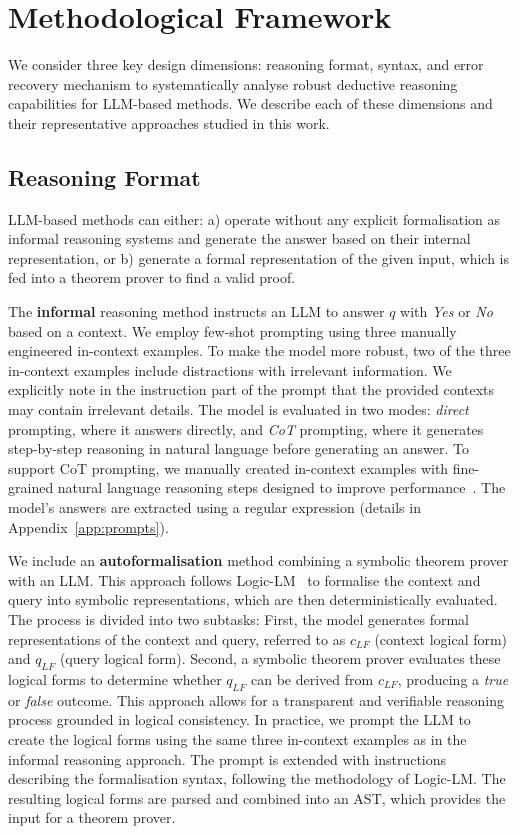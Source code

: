 \section{Methodological Framework}
We consider three key design dimensions: reasoning format, syntax, and error recovery mechanism to systematically analyse robust deductive reasoning capabilities for \ac{LLM}-based methods. We describe each of these dimensions and their representative approaches studied in this work. 

\subsection{Reasoning Format}
\ac{LLM}-based methods can either: a) operate without any explicit formalisation as informal reasoning systems and generate the answer based on their internal representation, or b) generate a formal representation of the given input, which is fed into a theorem prover to find a valid proof.   


The \textbf{informal} reasoning method instructs an \ac{LLM} to answer $q$ with \emph{Yes} or \emph{No} based on a context.
We employ few-shot prompting using three manually engineered in-context examples. To make the model more robust, two of the three in-context examples include distractions with irrelevant information. We explicitly note in the instruction part of the prompt that the provided contexts may contain irrelevant details.
The model is evaluated in two modes: \textit{direct} prompting, where it answers directly, and \textit{\ac{CoT}} prompting, where it generates step-by-step reasoning in natural language before generating an answer. To support \ac{CoT} prompting, we manually created in-context examples with fine-grained natural language reasoning steps designed to improve performance~\cite{wei_chain_2022}. 
The model’s answers are extracted using a regular expression (details in  Appendix~\ref{app:prompts}).


We include an \textbf{autoformalisation} method combining a symbolic theorem prover with an \ac{LLM}. This approach follows Logic-LM~\cite{liangming_pan_logiclm_2023} to formalise the context and query into symbolic representations, which are then deterministically evaluated. 
The process is divided into two subtasks: First, the model generates formal representations of the context and query, referred to as $c_{LF}$ (context logical form) and $q_{LF}$ (query logical form). Second, a symbolic theorem prover evaluates these logical forms to determine whether $q_{LF}$ can be derived from $c_{LF}$, producing a \emph{true} or \emph{false} outcome. This approach allows for a transparent and verifiable reasoning process grounded in logical consistency.
In practice, we prompt the \ac{LLM} to create the logical forms using the same three in-context examples as in the informal reasoning approach. The prompt is extended with instructions describing the formalisation syntax, following the methodology of Logic-LM. The resulting logical forms are parsed and combined into an \ac{AST}, which provides the input for a theorem prover. 


